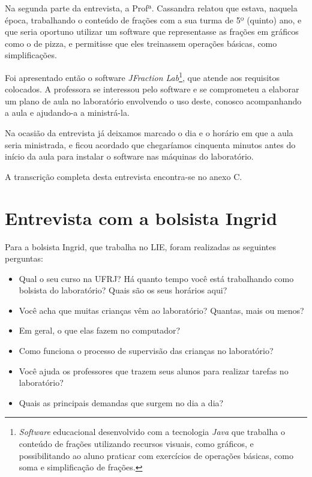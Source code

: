 Na segunda parte da entrevista, a Profª. Cassandra relatou que estava, naquela época, trabalhando o conteúdo de frações com a sua turma de 5º (quinto) ano, e que seria oportuno utilizar um software que representasse as frações em gráficos como o de pizza, e permitisse que eles treinassem operações básicas, como simplificações. 

Foi apresentado então o software \textit{JFraction Lab}\footnote{\textit{Software} educacional desenvolvido com a tecnologia \textit{Java} que trabalha o conteúdo de frações utilizando recursos visuais, como gráficos, e possibilitando ao aluno praticar com exercícios de operações básicas, como soma e simplificação de frações.}, que atende aos requisitos colocados. A professora se interessou pelo software e se comprometeu a elaborar um plano de aula no laboratório envolvendo o uso deste, conosco acompanhando a aula e ajudando-a a ministrá-la.

Na ocasião da entrevista já deixamos marcado o dia e o horário em que a aula seria ministrada, e ficou acordado que chegaríamos cinquenta minutos antes do início da aula para instalar o software nas máquinas do laboratório.

A transcrição completa desta entrevista encontra-se no anexo C.

\section{Entrevista com a bolsista Ingrid}\label{chp:LABEL_CHP_ENT_SEC_ING}

Para a bolsista Ingrid, que trabalha no LIE, foram realizadas as seguintes perguntas:

\begin{itemize}
\item{Qual o seu curso na UFRJ? Há quanto tempo você está trabalhando como bolsista do laboratório? Quais são os seus horários aqui?}
\item{Você acha que muitas crianças vêm ao laboratório? Quantas, mais ou menos?}
\item{Em geral, o que elas fazem no computador?}
\item{Como funciona o processo de supervisão das crianças no laboratório?}
\item{Você ajuda os professores que trazem seus alunos para realizar tarefas no laboratório?}
\item{Quais as principais demandas que surgem no dia a dia?}
\end{itemize}

